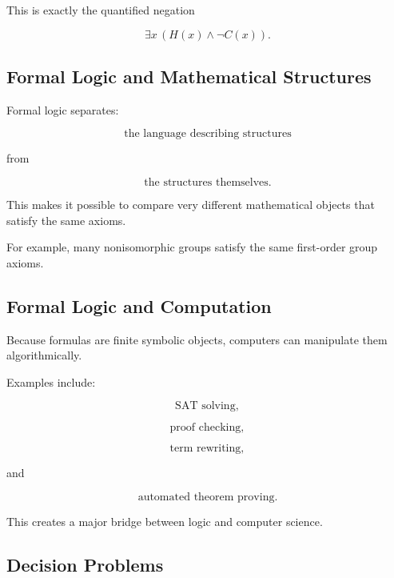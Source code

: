 This is exactly the quantified negation

\[
\boxed{
\exists x
\,
(H(x)\land\neg C(x)).
}
\]

\subsection{Formal Logic and Mathematical Structures}
\label{subsec:logic-mathematical-structures}

Formal logic separates:

\[
\boxed{
\text{the language describing structures}
}
\]

from

\[
\boxed{
\text{the structures themselves}.
}
\]

This makes it possible to compare very different mathematical objects that
satisfy the same axioms.

For example, many nonisomorphic groups satisfy the same first-order group
axioms.

\subsection{Formal Logic and Computation}
\label{subsec:formal-logic-computation}

Because formulas are finite symbolic objects, computers can manipulate
them algorithmically.

Examples include:

\[
\boxed{
\text{SAT solving},
}
\]

\[
\boxed{
\text{proof checking},
}
\]

\[
\boxed{
\text{term rewriting},
}
\]

and

\[
\boxed{
\text{automated theorem proving}.
}
\]

This creates a major bridge between logic and computer science.

\subsection{Decision Problems}
\label{subsec:logical-decision-problems}


